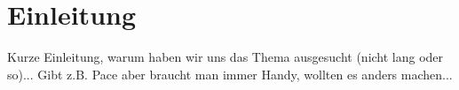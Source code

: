 \chapter*{Einleitung}
 
Kurze Einleitung, warum haben wir uns das Thema ausgesucht (nicht lang oder so)...
Gibt z.B. Pace aber braucht man immer Handy, wollten es anders machen...










